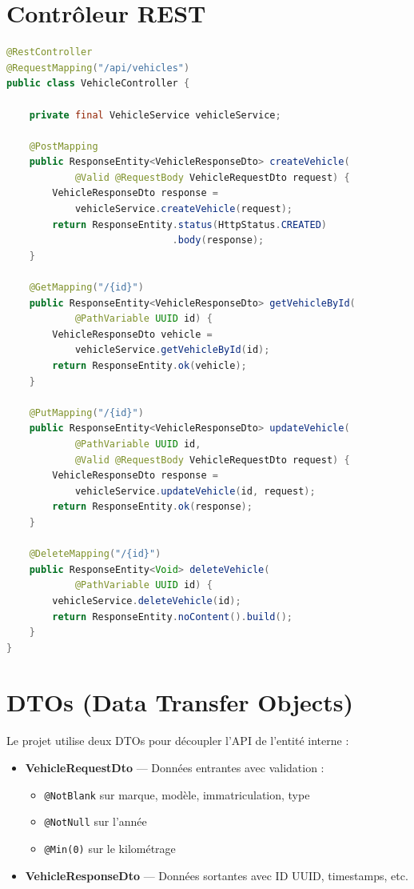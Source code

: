 \documentclass[12pt,a4paper]{report}
\begin{document}
\section{Contr\^oleur REST}

\begin{lstlisting}[style=javastyle, language=Java, caption={VehicleController.java}]
@RestController
@RequestMapping("/api/vehicles")
public class VehicleController {

    private final VehicleService vehicleService;

    @PostMapping
    public ResponseEntity<VehicleResponseDto> createVehicle(
            @Valid @RequestBody VehicleRequestDto request) {
        VehicleResponseDto response =
            vehicleService.createVehicle(request);
        return ResponseEntity.status(HttpStatus.CREATED)
                             .body(response);
    }

    @GetMapping("/{id}")
    public ResponseEntity<VehicleResponseDto> getVehicleById(
            @PathVariable UUID id) {
        VehicleResponseDto vehicle =
            vehicleService.getVehicleById(id);
        return ResponseEntity.ok(vehicle);
    }

    @PutMapping("/{id}")
    public ResponseEntity<VehicleResponseDto> updateVehicle(
            @PathVariable UUID id,
            @Valid @RequestBody VehicleRequestDto request) {
        VehicleResponseDto response =
            vehicleService.updateVehicle(id, request);
        return ResponseEntity.ok(response);
    }

    @DeleteMapping("/{id}")
    public ResponseEntity<Void> deleteVehicle(
            @PathVariable UUID id) {
        vehicleService.deleteVehicle(id);
        return ResponseEntity.noContent().build();
    }
}
\end{lstlisting}

\section{DTOs (Data Transfer Objects)}

Le projet utilise deux DTOs pour d\'ecoupler l'API de l'entit\'e interne :

\begin{itemize}
    \item \textbf{VehicleRequestDto} --- Donn\'ees entrantes avec validation :
    \begin{itemize}[nosep]
        \item \texttt{@NotBlank} sur marque, mod\`ele, immatriculation, type
        \item \texttt{@NotNull} sur l'ann\'ee
        \item \texttt{@Min(0)} sur le kilom\'etrage
    \end{itemize}
    \item \textbf{VehicleResponseDto} --- Donn\'ees sortantes avec ID UUID, timestamps, etc.
\end{itemize}
\end{document}
